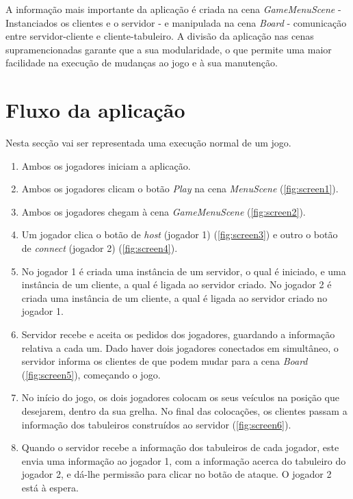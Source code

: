 A informação mais importante da aplicação é criada na cena \emph{GameMenuScene} - Instanciados os clientes e o servidor - e manipulada na cena \emph{Board} - comunicação entre servidor-cliente e cliente-tabuleiro.
A divisão da aplicação nas cenas supramencionadas garante que a sua modularidade, o que permite uma maior facilidade na execução de mudanças ao jogo e à sua manutenção.


\section{Fluxo da aplicação}
\label{chap4:sec:flow}
Nesta secção vai ser representada uma execução normal de um jogo.

\begin{enumerate}
    \item Ambos os jogadores iniciam a aplicação.
    \item Ambos os jogadores clicam o botão \textit{Play} na cena \emph{MenuScene} (\autoref{fig:screen1}).
    \item Ambos os jogadores chegam à cena \emph{GameMenuScene} (\autoref{fig:screen2}).
    \item Um jogador clica o botão de \emph{host} (jogador 1) (\autoref{fig:screen3}) e outro o botão de \emph{connect} (jogador 2) (\autoref{fig:screen4}).
    \item  No jogador 1 é criada uma instância de um servidor, o qual é iniciado, e uma instância de um cliente, a qual é ligada ao servidor criado. No jogador 2 é criada uma instância de um cliente, a qual é ligada ao servidor criado no jogador 1.
    \item Servidor recebe e aceita os pedidos dos jogadores, guardando a informação relativa a cada um. Dado haver dois jogadores conectados em simultâneo, o servidor informa os clientes de que podem mudar para a cena \emph{Board} (\autoref{fig:screen5}), começando o jogo.
    \item No início do jogo, os dois jogadores colocam os seus veículos na posição que desejarem, dentro da sua grelha. No final das colocações, os clientes passam a informação dos tabuleiros construídos ao servidor (\autoref{fig:screen6}).
    \item Quando o servidor recebe a informação dos tabuleiros de cada jogador, este envia uma informação ao jogador 1, com a informação acerca do tabuleiro do jogador 2, e dá-lhe permissão para clicar no botão de ataque. O jogador 2 está à espera.


\end{enumerate}
